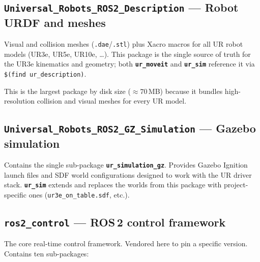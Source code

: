 \documentclass[11pt,a4paper]{article}
\newcommand{\pkg}[1]{\texttt{\textbf{#1}}}
\newcommand{\file}[1]{\texttt{#1}}
\begin{document}
\subsection{\texttt{Universal\_Robots\_ROS2\_Description} --- Robot URDF and meshes}

Visual and collision meshes (\texttt{.dae}/\texttt{.stl}) plus Xacro macros
for all UR robot models (UR3e, UR5e, UR10e, \ldots). This package is the
single source of truth for the UR3e kinematics and geometry; both
\pkg{ur\_moveit} and \pkg{ur\_sim} reference it via
\texttt{\$(find ur\_description)}.

This is the largest package by disk size ($\approx 70$\,MB) because it
bundles high-resolution collision and visual meshes for every UR model.

\subsection{\texttt{Universal\_Robots\_ROS2\_GZ\_Simulation} --- Gazebo simulation}

Contains the single sub-package \pkg{ur\_simulation\_gz}. Provides Gazebo
Ignition launch files and SDF world configurations designed to work with
the UR driver stack. \pkg{ur\_sim} extends and replaces the worlds from this
package with project-specific ones (\file{ur3e\_on\_table.sdf}, etc.).

\subsection{\texttt{ros2\_control} --- ROS\,2 control framework}

The core real-time control framework. Vendored here to pin a specific
version. Contains ten sub-packages:
\end{document}

